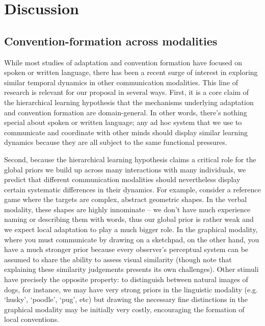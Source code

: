 \documentclass[11pt, floatsintext, jou]{apa6}
\begin{document}
\section{Discussion}

\subsection{Convention-formation across modalities}


While most studies of adaptation and convention formation have focused on spoken or written language, there has been a recent surge of interest in exploring similar temporal dynamics in other communication modalities. This line of research is relevant for our proposal in several ways. First, it is a core claim of the hierarchical learning hypothesis that the mechanisms underlying adaptation and convention formation are domain-general. In other words, there's nothing special about spoken or written language; any ad hoc system that we use to communicate and coordinate with other minds should display similar learning dynamics because they are all subject to the same functional pressures. 

Second, because the hierarchical learning hypothesis claims a critical role for the global priors we build up across many interactions with many individuals, we predict that different communication modalities should nevertheless display certain systematic differences in their dynamics. For example, consider a reference game where the targets are complex, abstract geometric shapes. In the verbal modality, these shapes are highly innominate -- we don't have much experience naming or describing them with words, thus our global prior is rather weak and we expect local adaptation to play a much bigger role. In the graphical modality, where you must communicate by drawing on a sketchpad, on the other hand, you have a much stronger prior because every observer's perceptual system can be assumed to share the ability to assess visual similarity (though note that explaining these similarity judgements presents its own challenges). Other stimuli have precisely the opposite property: to distinguish between natural images of dogs, for instance, we may have very strong priors in the linguistic modality (e.g. `husky', `poodle', `pug', etc) but drawing the necessary fine distinctions in the graphical modality may be initially very costly, encouraging the formation of local conventions. 
\end{document}
